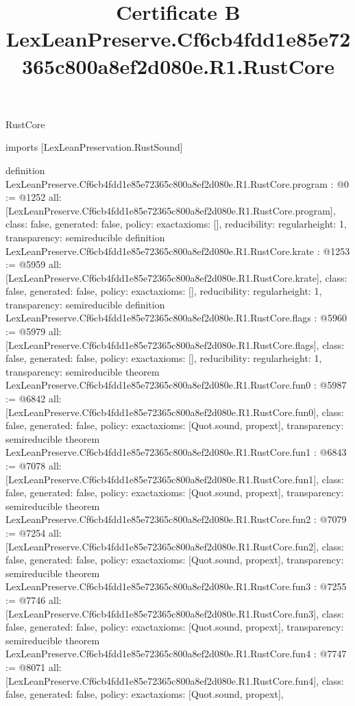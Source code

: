 \begin{lexlean}{RustCore}
\title{Certificate B LexLeanPreserve.Cf6cb4fdd1e85e72365c800a8ef2d080e.R1.RustCore}
\begin{coremodule}
imports [LexLeanPreservation.RustSound]

definition LexLeanPreserve.Cf6cb4fdd1e85e72365c800a8ef2d080e.R1.RustCore.program : @0 := @1252 {
  all: [LexLeanPreserve.Cf6cb4fdd1e85e72365c800a8ef2d080e.R1.RustCore.program],
  class: false,
  generated: false,
  policy: exact{axioms: []},
  reducibility: regular{height: 1},
  transparency: semireducible
}
definition LexLeanPreserve.Cf6cb4fdd1e85e72365c800a8ef2d080e.R1.RustCore.krate : @1253 := @5959 {
  all: [LexLeanPreserve.Cf6cb4fdd1e85e72365c800a8ef2d080e.R1.RustCore.krate],
  class: false,
  generated: false,
  policy: exact{axioms: []},
  reducibility: regular{height: 1},
  transparency: semireducible
}
definition LexLeanPreserve.Cf6cb4fdd1e85e72365c800a8ef2d080e.R1.RustCore.flags : @5960 := @5979 {
  all: [LexLeanPreserve.Cf6cb4fdd1e85e72365c800a8ef2d080e.R1.RustCore.flags],
  class: false,
  generated: false,
  policy: exact{axioms: []},
  reducibility: regular{height: 1},
  transparency: semireducible
}
theorem LexLeanPreserve.Cf6cb4fdd1e85e72365c800a8ef2d080e.R1.RustCore.fun0 : @5987 := @6842 {
  all: [LexLeanPreserve.Cf6cb4fdd1e85e72365c800a8ef2d080e.R1.RustCore.fun0],
  class: false,
  generated: false,
  policy: exact{axioms: [Quot.sound, propext]},
  transparency: semireducible
}
theorem LexLeanPreserve.Cf6cb4fdd1e85e72365c800a8ef2d080e.R1.RustCore.fun1 : @6843 := @7078 {
  all: [LexLeanPreserve.Cf6cb4fdd1e85e72365c800a8ef2d080e.R1.RustCore.fun1],
  class: false,
  generated: false,
  policy: exact{axioms: [Quot.sound, propext]},
  transparency: semireducible
}
theorem LexLeanPreserve.Cf6cb4fdd1e85e72365c800a8ef2d080e.R1.RustCore.fun2 : @7079 := @7254 {
  all: [LexLeanPreserve.Cf6cb4fdd1e85e72365c800a8ef2d080e.R1.RustCore.fun2],
  class: false,
  generated: false,
  policy: exact{axioms: [Quot.sound, propext]},
  transparency: semireducible
}
theorem LexLeanPreserve.Cf6cb4fdd1e85e72365c800a8ef2d080e.R1.RustCore.fun3 : @7255 := @7746 {
  all: [LexLeanPreserve.Cf6cb4fdd1e85e72365c800a8ef2d080e.R1.RustCore.fun3],
  class: false,
  generated: false,
  policy: exact{axioms: [Quot.sound, propext]},
  transparency: semireducible
}
theorem LexLeanPreserve.Cf6cb4fdd1e85e72365c800a8ef2d080e.R1.RustCore.fun4 : @7747 := @8071 {
  all: [LexLeanPreserve.Cf6cb4fdd1e85e72365c800a8ef2d080e.R1.RustCore.fun4],
  class: false,
  generated: false,
  policy: exact{axioms: [Quot.sound, propext]},
}
\end{coremodule}
\end{lexlean}

